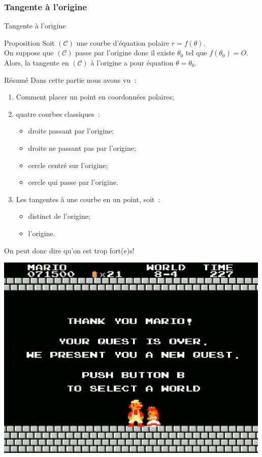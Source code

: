 \documentclass[14pt]{beamer}
\begin{document}
\subsubsection{Tangente à l'origine}
\begin{frame}{Tangente à l'origine}
        \begin{alertblock}{Proposition}
                Soit $(\mathcal{C})$ une courbe d'équation polaire $r=f(\theta)$.\\
                On suppose que $(\mathcal{C})$ passe par l'origine donc il existe $\theta_0$
                tel que $f(\theta_0)=O$.
                Alors, la tangente en $(\mathcal{C})$ à l'origine a pour équation $\theta=\theta_0$.
        \end{alertblock}
\end{frame}
\begin{frame}{Résumé}
        Dans cette partie nous avons vu~:
        \begin{enumerate}
                \item Comment placer un point en coordonnées polaires;
                \item quatre courbes classiques~:
                        \begin{itemize}
                                        \item droite passant par l'origine;
                                        \item droite ne passant pas par l'origine;
                                        \item cercle centré sur l'origine;
                                        \item cercle qui passe par l'origine.
                        \end{itemize}
                \item Les tangentes à une courbe en un point, soit~:
                        \begin{itemize}
                                \item distinct de l'origine;
                                \item l'origine.
                        \end{itemize}
        \end{enumerate}
        On peut donc dire qu'on est trop fort(e)s!
\end{frame}
\begin{frame}
        \includegraphics[height=\textheight]{images/mario.jpg}
\end{frame}
\end{document}
